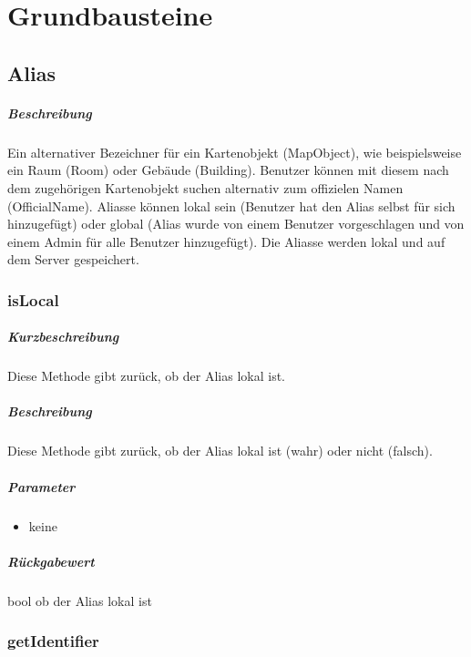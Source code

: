 \chapter{Grundbausteine}

\section{Alias}
\paragraph*{Beschreibung}
Ein alternativer Bezeichner für ein Kartenobjekt (MapObject), wie beispielsweise ein Raum (Room) oder Gebäude (Building).
Benutzer können mit diesem nach dem zugehörigen Kartenobjekt suchen alternativ zum offizielen Namen (OfficialName).
Aliasse können lokal sein (Benutzer hat den Alias selbst für sich hinzugefügt) oder global (Alias wurde von einem Benutzer vorgeschlagen und von einem Admin für alle Benutzer hinzugefügt).
Die Aliasse werden lokal und auf dem Server gespeichert.

\subsection{isLocal}%
\paragraph*{Kurzbeschreibung}
Diese Methode gibt zurück, ob der Alias lokal ist.
\paragraph*{Beschreibung}
Diese Methode gibt zurück, ob der Alias lokal ist (wahr) oder nicht (falsch).
\paragraph*{Parameter}
\begin{itemize}
    \item keine
\end{itemize}
\paragraph*{Rückgabewert}
bool ob der Alias lokal ist

\subsection{getIdentifier}%
